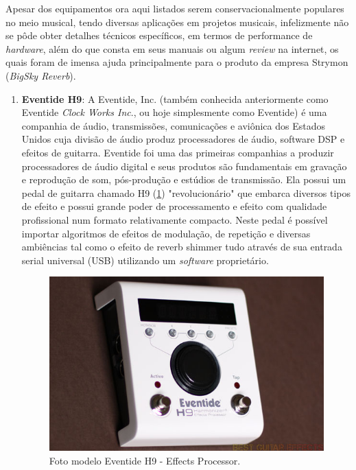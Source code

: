 			Apesar dos equipamentos ora aqui listados serem conservacionalmente populares no meio musical, tendo diversas aplicações em projetos musicais, infelizmente não se pôde obter detalhes técnicos específicos, em termos de performance de \textit{hardware}, além do que consta em seus manuais ou algum \textit{review} na internet, os quais foram de imensa ajuda principalmente para o produto da empresa Strymon (\textit{BigSky Reverb}).
			
			
			\begin{enumerate}
				\item \textbf{Eventide H9}: A Eventide, Inc. (também conhecida anteriormente como Eventide \textit{Clock Works Inc}., ou hoje simplesmente como Eventide) é uma companhia de áudio, transmissões, comunicações e aviônica dos Estados Unidos cuja divisão de áudio produz processadores de áudio, software DSP e efeitos de guitarra.
				Eventide foi uma das primeiras companhias a produzir processadores de áudio digital e seus produtos são fundamentais em gravação e reprodução de som, pós-produção e estúdios de transmissão. Ela possui um pedal de guitarra chamado H9 (\ref{eventide-h9}) "revolucionário" que embarca diversos tipos de efeito e possui grande poder de processamento e efeito com qualidade profissional num formato relativamente compacto. Neste pedal é possível importar algoritmos de efeitos de modulação, de repetição e diversas ambiências tal como o efeito de reverb shimmer tudo através de sua entrada serial universal (USB) utilizando um \textit{software} proprietário.
				
				\begin{figure}[!h]
					\centering
					\includegraphics[scale=0.3]{./figuras/eventide-h9.jpg}
					\caption{Foto modelo Eventide H9 - Effects Processor.}
					\label{eventide-h9}
				\end{figure}
				

\end{enumerate}
